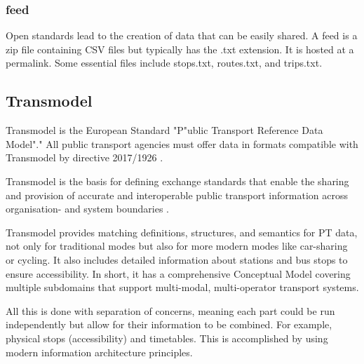 \subsubsection{ feed}
Open standards lead to the creation of data that can be easily shared. A feed is a zip file containing CSV files but typically has the .txt extension. It is hosted at a permalink. Some essential files include stops.txt, routes.txt, and trips.txt.

\subsection{Transmodel}
Transmodel is the European Standard "P"ublic Transport Reference Data Model"." All public transport agencies must offer data in formats compatible with Transmodel by directive 2017/1926 \cite{noauthor_delegated_nodate}.

Transmodel is the basis for defining exchange standards that enable the sharing and provision of accurate and interoperable public transport information across organisation- and system boundaries \cite{noauthor_transmodel_nodate}.

Transmodel provides matching definitions, structures, and semantics for PT data, not only for traditional modes but also for more modern modes like car-sharing or cycling. It also includes detailed information about stations and bus stops to ensure accessibility. In short, it has a comprehensive Conceptual Model covering multiple subdomains that support multi-modal, multi-operator transport systems.

All this is done with separation of concerns, meaning each part could be run independently but allow for their information to be combined. For example, physical stops (accessibility) and timetables. This is accomplished by using modern information architecture principles.

